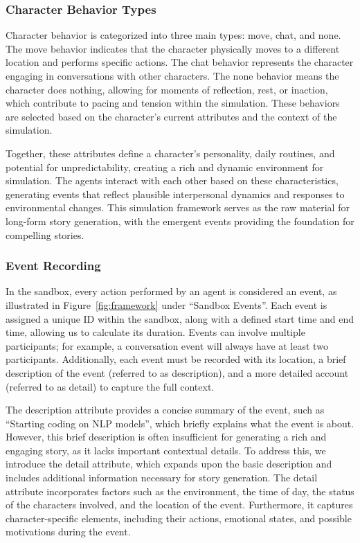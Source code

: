 \documentclass[letterpaper]{article} %
\begin{document}
\subsubsection{Character Behavior Types}

Character behavior is categorized into three main types: move, chat, and none. The move behavior indicates that the character physically moves to a different location and performs specific actions. The chat behavior represents the character engaging in conversations with other characters. The none behavior means the character does nothing, allowing for moments of reflection, rest, or inaction, which contribute to pacing and tension within the simulation. These behaviors are selected based on the character's current attributes and the context of the simulation.

Together, these attributes define a character's personality, daily routines, and potential for unpredictability, creating a rich and dynamic environment for simulation. The agents interact with each other based on these characteristics, generating events that reflect plausible interpersonal dynamics and responses to environmental changes. This simulation framework serves as the raw material for long-form story generation, with the emergent events providing the foundation for compelling stories.

\subsubsection{Event Recording}

In the sandbox, every action performed by an agent is considered an event, as illustrated in Figure~\ref{fig:framework} under ``Sandbox Events''. Each event is assigned a unique ID within the sandbox, along with a defined start time and end time, allowing us to calculate its duration. Events can involve multiple participants; for example, a conversation event will always have at least two participants. Additionally, each event must be recorded with its location, a brief description of the event (referred to as description), and a more detailed account (referred to as detail) to capture the full context.

The description attribute provides a concise summary of the event, such as ``Starting coding on NLP models'', which briefly explains what the event is about. However, this brief description is often insufficient for generating a rich and engaging story, as it lacks important contextual details. To address this, we introduce the detail attribute, which expands upon the basic description and includes additional information necessary for story generation. The detail attribute incorporates factors such as the environment, the time of day, the status of the characters involved, and the location of the event. Furthermore, it captures character-specific elements, including their actions, emotional states, and possible motivations during the event.
\end{document}
